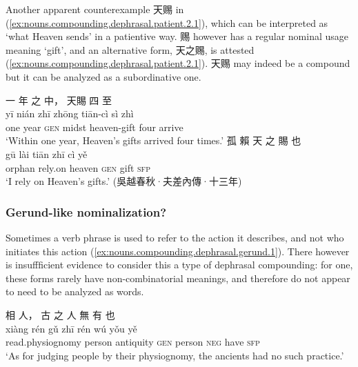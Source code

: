 \documentclass[UTF8, a4paper, oneside, scheme=plain, 12pt]{ctexrep}
\newcommand{\translate}[1]{`#1'}
\newcommand*{\category}[1]{\textsc{#1}}
\begin{document}
Another apparent counterexample 天赐 in (\ref{ex:nouns.compounding.dephrasal.patient.2.1}),
which can be interpreted as \translate{what Heaven sends} in a patientive way.
赐 however has a regular nominal usage meaning \translate{gift},
and an alternative form, 天之赐, is attested (\ref{ex:nouns.compounding.dephrasal.patient.2.1}).
天赐 may indeed be a compound but it can be analyzed as a subordinative one.

\begin{exe} 
    \ex\label{ex:nouns.compounding.dephrasal.patient.2}
    \glll 一 年 之 中， 天賜 四 至 \\
    yī nián zhī zhōng tiān-cì sì zhì \\
    one year \category{gen} midst heaven-gift four arrive \\
    \glt\translate{Within one year, Heaven's gifts arrived four times.}
    \ex\label{ex:nouns.compounding.dephrasal.patient.2.1}
    \glll 孤 賴 天 之 賜 也 \\
    gū lài tiān zhī cì yě \\
    orphan rely.on heaven \category{gen} gift \category{sfp} \\
    \glt\translate{I rely on Heaven's gifts.} \hfill (吳越春秋·夫差內傳·十三年)
\end{exe}

\subsubsection{Gerund-like nominalization?}

Sometimes a verb phrase is used to refer to the action it describes,
and not who initiates this action (\ref{ex:nouns.compounding.dephrasal.gerund.1}).
There however is insuffficient evidence to consider this a type of dephrasal compounding:
for one, these forms rarely have non-combinatorial meanings,
and therefore do not appear to need to be analyzed as words.

\begin{exe}
    \ex\label{ex:nouns.compounding.dephrasal.gerund.1}
    \glll 相 人， 古 之 人 無 有 也 \\
    xiàng rén gǔ zhī rén wú yǒu yě \\
    read.physiognomy person antiquity \category{gen} person \category{neg} have \category{sfp} \\
    \glt\translate{As for judging people by their physiognomy, the ancients had no such practice.}
\end{exe}
\end{document}
